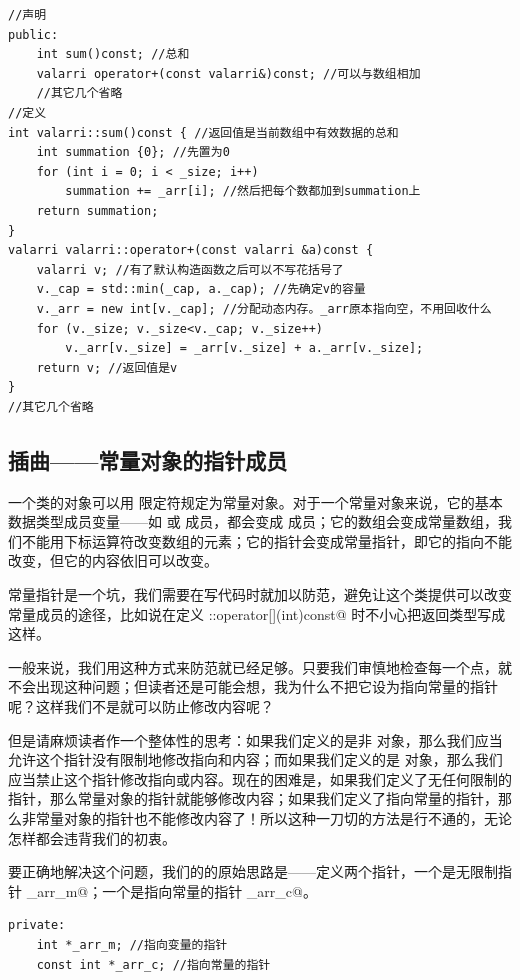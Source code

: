 \begin{lstlisting}  
//声明
public:
    int sum()const; //总和
    valarri operator+(const valarri&)const; //可以与数组相加
    //其它几个省略
//定义
int valarri::sum()const { //返回值是当前数组中有效数据的总和
    int summation {0}; //先置为0
    for (int i = 0; i < _size; i++)
        summation += _arr[i]; //然后把每个数都加到summation上
    return summation;
}
valarri valarri::operator+(const valarri &a)const {
    valarri v; //有了默认构造函数之后可以不写花括号了
    v._cap = std::min(_cap, a._cap); //先确定v的容量
    v._arr = new int[v._cap]; //分配动态内存。_arr原本指向空，不用回收什么
    for (v._size; v._size<v._cap; v._size++)
        v._arr[v._size] = _arr[v._size] + a._arr[v._size];
    return v; //返回值是v
}
//其它几个省略
\end{lstlisting}
\subsection*{插曲——常量对象的指针成员}
一个类的对象可以用 \lstinline@const@ 限定符规定为常量对象。对于一个常量对象来说，它的基本数据类型成员变量——如 \lstinline@int@ 或 \lstinline@double@ 成员，都会变成 \lstinline@const@ 成员；它的数组会变成常量数组，我们不能用下标运算符改变数组的元素；它的指针会变成常量指针，即它的指向不能改变，但它的内容依旧可以改变。\par
常量指针是一个坑，我们需要在写代码时就加以防范，避免让这个类提供可以改变常量成员的途径，比如说在定义 \lstinline@valarri::operator[](int)const@ 时不小心把返回类型写成 \lstinline@int@ 这样。\par
一般来说，我们用这种方式来防范就已经足够。只要我们审慎地检查每一个点，就不会出现这种问题；但读者还是可能会想，我为什么不把它设为指向常量的指针呢？这样我们不是就可以防止修改内容呢？\par
但是请麻烦读者作一个整体性的思考：如果我们定义的是非 \lstinline@const@ 对象，那么我们应当允许这个指针没有限制地修改指向和内容；而如果我们定义的是 \lstinline@const@ 对象，那么我们应当禁止这个指针修改指向或内容。现在的困难是，如果我们定义了无任何限制的指针，那么常量对象的指针就能够修改内容；如果我们定义了指向常量的指针，那么非常量对象的指针也不能修改内容了！所以这种一刀切的方法是行不通的，无论怎样都会违背我们的初衷。\par
要正确地解决这个问题，我们的的原始思路是——定义两个指针，一个是无限制指针 \lstinline@_arr_m@；一个是指向常量的指针 \lstinline@_arr_c@。
\begin{lstlisting}
private:
    int *_arr_m; //指向变量的指针
    const int *_arr_c; //指向常量的指针
\end{lstlisting}
